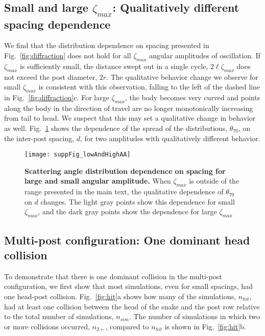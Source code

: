 \documentclass[aps,pre,twocolumn,superscriptaddress]{revtex4-1}
\begin{document}
\subsection{Small and large $\zeta_{max}$: Qualitatively different spacing dependence}
We find that the distribution dependence on spacing presented in Fig.~\ref{fig:diffraction} does not hold for all $\zeta_{max}$ angular amplitudes of oscillation.  If $\zeta_{max}$ is sufficiently small, the distance swept out in a single cycle, $2\ell \zeta_{max}$ does not exceed the post diameter, $2r$. The qualitative behavior change we observe for small $\zeta_{max}$ is consistent with this observation, falling to the left of the dashed line in Fig.~\ref{fig:diffraction}c. For large $\zeta_{max}$, the body becomes very curved and points along the body in the direction of travel are no longer monotonically increasing from tail to head. We suspect that this may set a qualitative change in behavior as well.  Fig.~\ref{fig:spacing} shows the dependence of the spread of the distributions, $\theta_{70}$, on the inter-post spacing, $d$, for two amplitudes with qualitatively different behavior.
\begin{figure}[h!]
	\texttt{[image: suppFig\_lowAndHighAA]}
	\caption{\textbf{Scattering angle distribution dependence on spacing for large and small angular amplitude.} When $\zeta_{max}$ is outside of the range presented in the main text, the qualitative dependence of $\theta_{70}$ on $d$ changes. The light gray points show this dependence for small $\zeta_{max}$, and the dark gray points show the dependence for large $\zeta_{max}$}
	\label{fig:spacing}
\end{figure}

\subsection{Multi-post configuration: One dominant head collision}
\label{suppmat:head}
To demonstrate that there is one dominant collision in the multi-post configuration, we first show that most simulations, even for small spacings, had one head-post collision. Fig.~\ref{fig:hit}a shows how many of the simulations, $n_{hit}$, had at least one collision between the head of the snake and the post row relative to the total number of simulations, $n_{sim}$. The number of simulations in which two or more collisions occurred, $n_{2+}$, compared to $n_{hit}$ is shown in Fig.~\ref{fig:hit}b.    
\end{document}
